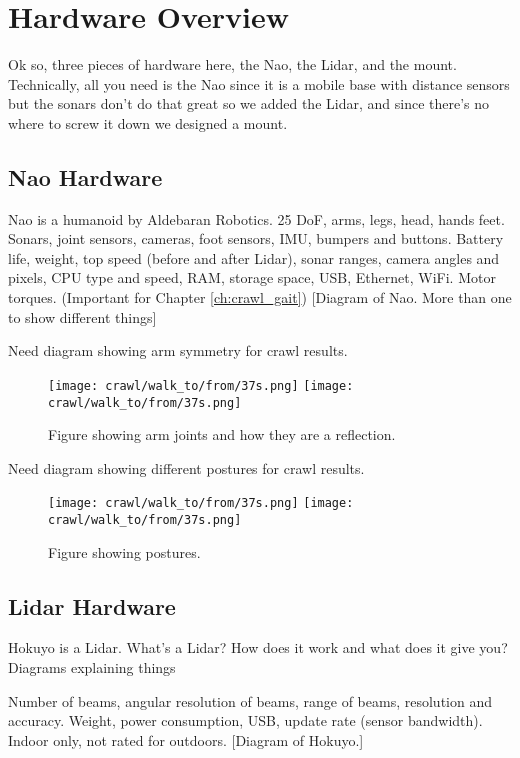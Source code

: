\section{Hardware Overview}
Ok so, three pieces of hardware here, the Nao, the Lidar, and the mount.
Technically, all you need is the Nao since it is a mobile base with distance sensors but the sonars
don't do that great so we added the Lidar, and since there's no where to screw it down we designed a mount.

\subsection{Nao Hardware}
Nao is a humanoid by Aldebaran Robotics. 25 DoF, arms, legs, head, hands feet. Sonars, joint sensors, cameras,
foot sensors, IMU, bumpers and buttons. Battery life, weight, top speed (before and after Lidar), sonar ranges, camera angles and pixels,
CPU type and speed, RAM, storage space, USB, Ethernet, WiFi.
Motor torques. (Important for Chapter \ref{ch:crawl_gait})
[Diagram of Nao. More than one to show different things]

Need diagram showing arm symmetry for crawl results. 
\begin{figure}
  \centerline{
    \texttt{[image: crawl/walk\_to/from/37s.png]}
    \texttt{[image: crawl/walk\_to/from/37s.png]}
  }
  \caption{Figure showing arm joints and how they are a reflection.}
  \label{fig:nao_arm_joints_reflect1}
\end{figure}

Need diagram showing different postures for crawl results. 
\begin{figure}
  \centerline{
    \texttt{[image: crawl/walk\_to/from/37s.png]}
    \texttt{[image: crawl/walk\_to/from/37s.png]}
  }
  \caption{Figure showing postures.}
  \label{fig:nao_postures1}
\end{figure}

\subsection{Lidar Hardware}
Hokuyo is a Lidar. What's a Lidar? How does it work and what does it give you? 
{Diagrams explaining things}

Number of beams, angular resolution of beams, range of beams, resolution and accuracy.
Weight, power consumption, USB, update rate (sensor bandwidth).
Indoor only, not rated for outdoors.
[Diagram of Hokuyo.]

